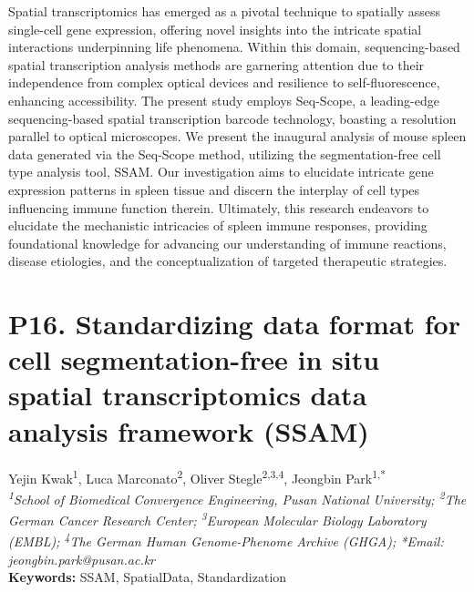 \noindent
Spatial transcriptomics has emerged as a pivotal technique to spatially assess single-cell gene expression, offering novel insights into the intricate spatial interactions underpinning life phenomena. Within this domain, sequencing-based spatial transcription analysis methods are garnering attention due to their independence from complex optical devices and resilience to self-fluorescence, enhancing accessibility. The present study employs Seq-Scope, a leading-edge sequencing-based spatial transcription barcode technology, boasting a resolution parallel to optical microscopes. We present the inaugural analysis of mouse spleen data generated via the Seq-Scope method, utilizing the segmentation-free cell type analysis tool, SSAM. Our investigation aims to elucidate intricate gene expression patterns in spleen tissue and discern the interplay of cell types influencing immune function therein. Ultimately, this research endeavors to elucidate the mechanistic intricacies of spleen immune responses, providing foundational knowledge for advancing our understanding of immune reactions, disease etiologies, and the conceptualization of targeted therapeutic strategies.
\newpage

\section*{P16. Standardizing data format for cell segmentation-free in situ spatial transcriptomics data analysis framework (SSAM)}

\begin{center}
Yejin Kwak\textsuperscript{1}, Luca Marconato\textsuperscript{2}, Oliver Stegle\textsuperscript{2,3,4}, Jeongbin Park\textsuperscript{1,*} \\
\vspace{0.2cm}
\textit{\textsuperscript{1}School of Biomedical Convergence Engineering, Pusan National University; \textsuperscript{2}The German Cancer Research Center; \textsuperscript{3}European Molecular Biology Laboratory (EMBL); \textsuperscript{4}The German Human Genome-Phenome Archive (GHGA); *Email: jeongbin.park@pusan.ac.kr} \\
\vspace{0.2cm}
\textbf{Keywords:} SSAM, SpatialData, Standardization
\end{center}

